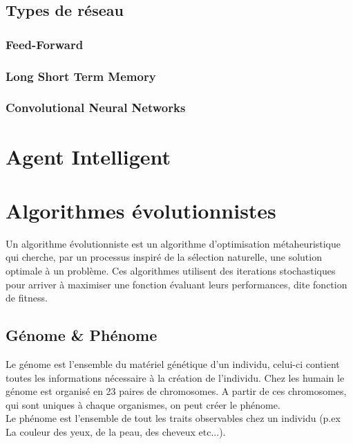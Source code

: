 \documentclass{article}
\begin{document}
\subsection{Types de réseau}
\subsubsection{Feed-Forward}
\subsubsection{Long Short Term Memory}
\subsubsection{Convolutional Neural Networks}



\newpage
\section{Agent Intelligent}


\newpage
\section{Algorithmes évolutionnistes}

Un algorithme évolutionniste est un algorithme d'optimisation métaheuristique qui cherche, par un processus inspiré de la sélection naturelle, une solution optimale à un problème. Ces algorithmes utilisent des iterations stochastiques pour arriver à maximiser une fonction évaluant leurs performances, dite fonction de fitness.\cite{wikiea}\\

\subsection{Génome \& Phénome}

Le génome est l'ensemble du matériel génétique d'un individu, celui-ci contient toutes les informations nécessaire à la création de l'individu.\cite{wikigenome} Chez les humain le génome est organisé en 23 paires de chromosomes. A partir de ces chromosomes, qui sont uniques à chaque organismes, on peut créer le phénome.\\
Le phénome est l'ensemble de tout les traits observables chez un individu (p.ex La couleur des yeux, de la peau, des cheveux etc...).\cite{wikiphenome}\\
\end{document}

